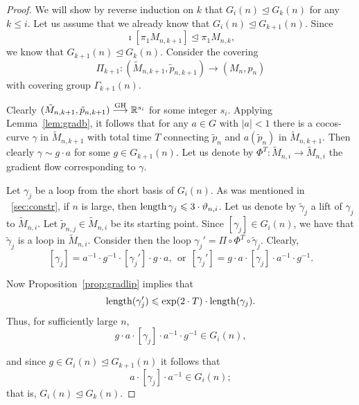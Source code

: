 \documentclass{amsart}
\begin{document}
\begin{proof}
We will show by reverse induction on $k$
that $G_i(n)\unlhd G_{k}(n)$ for any $k\le i$.
Let us assume that we already know that $G_i(n)\unlhd G_{k+1}(n)$.
Since 
$$\imath[\pi_1M_{n,k+1}]\unlhd\pi_1M_{n,k},$$
we know that $G_{k+1}(n)\unlhd G_{k}(n)$.
Consider the covering
$$\Pi_{k+1}\colon (\tilde M_{n,k+1},\tilde p_{n,k+1})\to (M_n,p_n)$$
with covering group $\Gamma_{k+1}(n)$.



Clearly $(\tilde M_{n,k+1},\tilde p_{n,k+1})\GHto {\Bbb R}^{s_i}$
for some integer $s_i$.
Applying Lemma~\ref{lem:gradb}, it follows
that for any $a\in G$ with $|a|<1$ there is
a cocos-curve $\gamma$ in $\tilde M_{n,k+1}$
with total time $T$ connecting
$\tilde p_n$ and $a(\tilde p_n)$ in $\tilde M_{n,k+1}$.
Then clearly $\gamma\sim g\cdot a$ for some $g\in G_{k+1}(n)$.
Let us denote by $\Phi^T\colon  \tilde M_{n,i}\to \tilde M_{n,i}$ the gradient flow
corresponding  to $\gamma$.

Let $\gamma_j$ be a loop
from the short basis of $G_i(n)$.
As was mentioned in ~\ref{sec:constr},
if $n$ is large, then $\operatorname{\rm length}\gamma_j\leqslant 3\cdot \vartheta_{n,i}$.
Let us denote by  $\tilde\gamma_j$ a lift of $\gamma_j$ to $\tilde M_{n,i}$.
Let $\tilde p_{n,j}\in \tilde M_{n,i}$ be its starting point.
Since $[\gamma_j]\in G_i(n)$, we have that
$\tilde\gamma_j$ is a loop in $\tilde M_{n,i}$.
Consider then the loop
 $\gamma_j'=\Pi\circ\Phi^T\circ
\tilde\gamma_j$.
Clearly,
$$[\gamma_j]=a^{-1}\cdot g^{-1}\cdot [\gamma_j']\cdot g\cdot a ,
\ \ \text{or}\ \ [\gamma_j']=g\cdot a\cdot [\gamma_j]\cdot a^{-1}\cdot g^{-1}.$$


Now Proposition~\ref{prop:gradlip} implies that
$$\operatorname{\rm length}(\gamma_j')\leqslant \exp(2\cdot T)\cdot \operatorname{\rm length}(\gamma_j).$$
Thus, for sufficiently large $n$,
$$ g\cdot a\cdot [\gamma_j]\cdot a^{-1}\cdot g^{-1} \in G_i(n),$$

and since $g\in G_i(n)\unlhd  G_{k+1}(n)$ it follows that
$$ a\cdot [\gamma_j]\cdot a^{-1} \in G_i(n);$$
that is, $G_i(n)\unlhd  G_{k}(n)$.

\end{proof}
\end{document}
